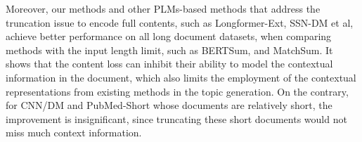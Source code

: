 \documentclass[11pt]{article}
\begin{document}
Moreover, our methods and other PLMs-based methods that address the truncation issue to encode full contents, such as Longformer-Ext, SSN-DM et al, achieve better performance on all long document datasets, when comparing methods with the input length limit, such as BERTSum, and MatchSum.
It shows that the content loss can inhibit their ability to model the contextual information in the document, which also limits the employment of the contextual representations from existing methods in the topic generation.
On the contrary, for CNN/DM and PubMed-Short whose documents are relatively short, the improvement is insignificant, since truncating these short documents would not miss much context information.
\begin{table}[!hbt]
\scriptsize
    \centering
\caption{ROUGE F1 results of our model under different settings on PubMed-Long and Arxiv.}
    \label{tab:abla}
\end{table}
\end{document}
